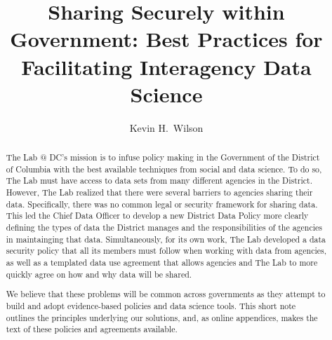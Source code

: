 \documentclass[sigconf]{acmart}
\begin{document}
\title[Sharing Securely within Government]{Sharing Securely within Government: Best Practices for Facilitating Interagency Data Science}

\author{Kevin H.~Wilson}

\begin{abstract}
  The Lab @ DC's mission is to infuse policy making in the Government of the District of Columbia with the best available techniques from social and data science. To do so, The Lab must have access to data sets from many different agencies in the District. However, The Lab realized that there were several barriers to agencies sharing their data. Specifically, there was no common legal or security framework for sharing data. This led the Chief Data Officer to develop a new District Data Policy more clearly defining the types of data the District manages and the responsibilities of the agencies in maintainging that data. Simultaneously, for its own work, The Lab developed a data security policy that all its members must follow when working with data from agencies, as well as a templated data use agreement that allows agencies and The Lab to more quickly agree on how and why data will be shared.

We believe that these problems will be common across governments as they attempt to build and adopt evidence-based policies and data science tools. This short note outlines the principles underlying our solutions, and, as online appendices, makes the text of these policies and agreements available.
\end{abstract}


\maketitle





\end{document}
